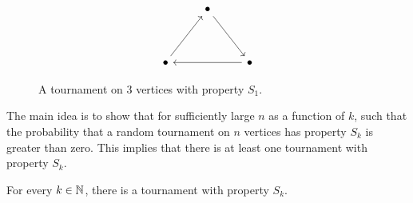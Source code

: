 \begin{figure}
    \centering
    \[\begin{tikzcd}
        & \bullet \\
        \\
        \bullet && \bullet
        \arrow[from=3-1, to=1-2]
        \arrow[from=1-2, to=3-3]
        \arrow[from=3-3, to=3-1]
    \end{tikzcd}\]
    \caption{A tournament on 3 vertices with property $S_1$.}
    \label{fig:tournament}
\end{figure}

The main idea is to show that for sufficiently large $n$ as a function of $k$, such that the probability that a random tournament on $n$ vertices has property $S_k$ is greater than zero. This implies that there is at least one tournament with property $S_k$. \par


\begin{theorem}
    For every $k \in \mathbb{N}$, there is a tournament with property $S_k$. 
\end{theorem}


